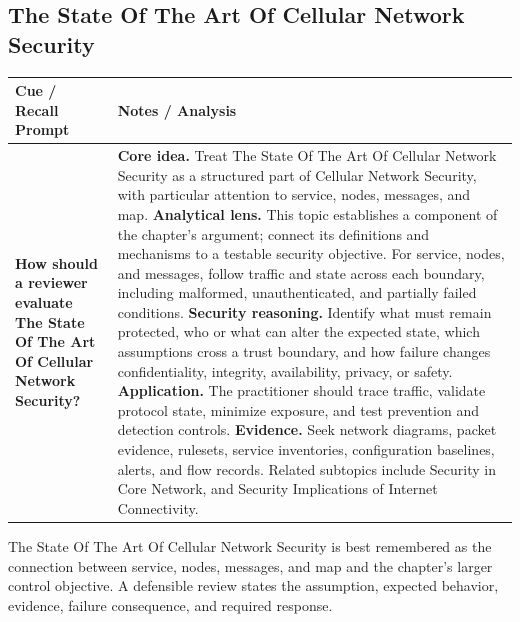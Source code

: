 \documentclass[11pt]{article}
\newcommand{\CornellHeader}{%
\rowcolor{Navy}\color{white}\bfseries Cue / Recall Prompt & \color{white}\bfseries Notes / Analysis\\\hline}
\newcommand{\CornellRow}[2]{%
\cellcolor{CueGray}\RaggedRight\textbf{#1} & \RaggedRight #2\\\hline}
\begin{document}
\subsection*{The State Of The Art Of Cellular Network Security}
\begin{longtable}{>{\RaggedRight\arraybackslash}p{}|>{\RaggedRight\arraybackslash}p{}}
\CornellHeader
\CornellRow{How should a reviewer evaluate The State Of The Art Of Cellular Network Security?}{\textbf{Core idea.} Treat The State Of The Art Of Cellular Network Security as a structured part of Cellular Network Security, with particular attention to service, nodes, messages, and map. \textbf{Analytical lens.} This topic establishes a component of the chapter's argument; connect its definitions and mechanisms to a testable security objective. For service, nodes, and messages, follow traffic and state across each boundary, including malformed, unauthenticated, and partially failed conditions. \textbf{Security reasoning.} Identify what must remain protected, who or what can alter the expected state, which assumptions cross a trust boundary, and how failure changes confidentiality, integrity, availability, privacy, or safety. \textbf{Application.} The practitioner should trace traffic, validate protocol state, minimize exposure, and test prevention and detection controls. \textbf{Evidence.} Seek network diagrams, packet evidence, rulesets, service inventories, configuration baselines, alerts, and flow records. Related subtopics include Security in Core Network, and Security Implications of Internet Connectivity.}
\end{longtable}
\begin{topicsummary}
The State Of The Art Of Cellular Network Security is best remembered as the connection between service, nodes, messages, and map and the chapter's larger control objective. A defensible review states the assumption, expected behavior, evidence, failure consequence, and required response.
\end{topicsummary}
\end{document}
